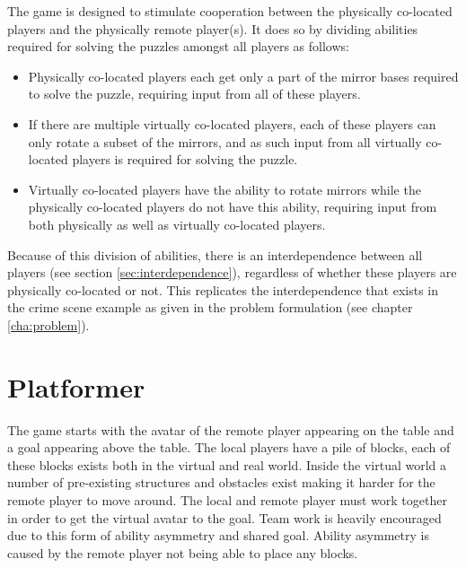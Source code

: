 	The game is designed to stimulate cooperation between the physically 
	co-located players and the physically remote player(s). It does so by 
	dividing abilities required for solving the puzzles amongst all players 
	as follows:
	
	\begin{itemize}
		\item Physically co-located players each get only a part of the 
		      mirror bases required to solve the puzzle, requiring input 
		      from all of these players.
		\item If there are multiple virtually co-located players, each of 
		      these players can only rotate a subset of the mirrors, and 
		      as such input from all virtually co-located players is 
		      required for solving the puzzle. 
		\item Virtually co-located players have the ability to rotate 
		      mirrors while the physically co-located players do not have 
		      this ability, requiring input from both physically as well
		      as virtually co-located players.
	\end{itemize}

	Because of this division of abilities, there is an interdependence 
	between all players (see section \ref{sec:interdependence}), regardless of
	whether these players are physically co-located or not. This replicates the 
	interdependence that exists in the crime scene example as given in the 
	problem formulation (see chapter \ref{cha:problem}).

\section{Platformer}
The game starts with the avatar of the remote player appearing
 on the table and a goal appearing above the table. The local
  players have a pile of blocks, each of these blocks exists both
   in the virtual and real world. 
Inside the virtual world a number of pre-existing structures and
 obstacles exist making it harder for the remote player to move around. 
The local and remote player must work together in order to get the
 virtual avatar to the goal. 
Team work is heavily encouraged due to this form of ability 
asymmetry and shared goal. Ability asymmetry is caused by the remote
player not being able to place any blocks.

